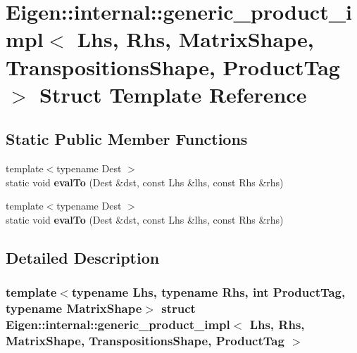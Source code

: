 \hypertarget{struct_eigen_1_1internal_1_1generic__product__impl_3_01_lhs_00_01_rhs_00_01_matrix_shape_00_01_tf888e33b0f360ba10ea614ccb9c9fdb1}{}\section{Eigen\+:\+:internal\+:\+:generic\+\_\+product\+\_\+impl$<$ Lhs, Rhs, Matrix\+Shape, Transpositions\+Shape, Product\+Tag $>$ Struct Template Reference}
\label{struct_eigen_1_1internal_1_1generic__product__impl_3_01_lhs_00_01_rhs_00_01_matrix_shape_00_01_tf888e33b0f360ba10ea614ccb9c9fdb1}
\subsection*{Static Public Member Functions}
\begin{DoxyCompactItemize}
\item 
\mbox{\label{struct_eigen_1_1internal_1_1generic__product__impl_3_01_lhs_00_01_rhs_00_01_matrix_shape_00_01_tf888e33b0f360ba10ea614ccb9c9fdb1_a8ab4d110bcc31d324db2496a372e4661}} 
{\footnotesize template$<$typename Dest $>$ }\\static void {\bfseries eval\+To} (Dest \&dst, const Lhs \&lhs, const Rhs \&rhs)
\item 
\mbox{\label{struct_eigen_1_1internal_1_1generic__product__impl_3_01_lhs_00_01_rhs_00_01_matrix_shape_00_01_tf888e33b0f360ba10ea614ccb9c9fdb1_a8ab4d110bcc31d324db2496a372e4661}} 
{\footnotesize template$<$typename Dest $>$ }\\static void {\bfseries eval\+To} (Dest \&dst, const Lhs \&lhs, const Rhs \&rhs)
\end{DoxyCompactItemize}


\subsection{Detailed Description}
\subsubsection*{template$<$typename Lhs, typename Rhs, int Product\+Tag, typename Matrix\+Shape$>$\newline
struct Eigen\+::internal\+::generic\+\_\+product\+\_\+impl$<$ Lhs, Rhs, Matrix\+Shape, Transpositions\+Shape, Product\+Tag $>$}



